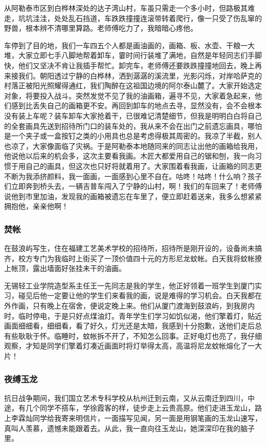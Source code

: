 \documentclass{article}
\begin{document}
从阿勒泰市区到白桦林深处的达子湾山村，车虽只需走一个多小时，但路极其难走，坑坑洼洼，处处乱石挡道，车跌跌撞撞连滚带转着爬行，像一只受了伤乱窜的野兽，根本辨不清哪里算路。老师傅吃力了，我暗暗心疼他。

车停到了目的地，我们一车四五个人都是画油画的，画箱、板、水壶、干粮一大堆，大家立即七手八脚地帮着卸车，霎时间行装堆了满地，自然是年轻同志们手脚快，他们又坚决不肯让我插手帮忙。卸完车，老师傅还要跌跌撞撞地回去，晚上再来接我们。朝阳透过宁静的白桦林，洒到潺潺的溪流里，光影闪烁，对岸哈萨克的村落正被阳光照耀得通红，我们陶醉在这祖国边境的阿尔泰山麓了。大家开始选定对象，将要投入战斗。突然发觉不见了我的油画箱，遍寻不见，大家着急起来，他们感到比丢失自己的画箱更不安。再回到卸车的地点去寻，显然没有，会不会根本没有装上车呢？装车卸车大家抢着干，已很难记清楚细节，但我是明明白白将自己的全套画具先送到招待所门口的装车处的，我从来不会在出门之前遗忘画具，哪怕是一个夹子或一盒按钉之类的小用具也总是考虑得极其周密的。我凉了半截，别人也凉了，大家像面临了灾祸。于是阿勒泰本地随同来的同志让出他的画箱给我用，他说他以后来的机会多，这次主要看我画。木匠大都爱用自己的锯和刨，我一向习惯于用自己的画具，但这次也只好将就着用了。大家围着看我画，让画箱的同志更不断为我添挤颜料，我一面画，一面感到心里不自在。咕咚！咕咚！什么响？孩子们立即奔到桥头去，一辆吉普车闯入了宁静的山村，啊！我们的车回来了！老师傅说他到市里加油，发现我的画箱被遗忘在车里了，便立即赶着送来，我多么想紧紧拥抱他，亲亲他啊！
\subsubsection{焚帐}
在鼓浪屿写生，住在福建工艺美术学校的招待所，招待所是刚开设的，设备尚未搞齐，校方专门为我临时上街买了一顶价值四十元的方形尼龙蚊帐。白天我将蚊帐撩上帐顶，露出墙面好张挂未干的油画。

无锡轻工业学院造型系主任王一先同志是我的学生，他正好领着一班学生到厦门实习，碰见后他一定要让他的学生们来看我的画，说是难得的学习机会。白天我都在外作画，只有晚上在宿舍，便说定晚上来。他们从厦门渡海到鼓浪屿，到我房内时，临时停电，于是只好点煤油灯。青年学生们学习如饥似渴，他们擎着灯，贴近画面细细看，细细看，看了好久，灯光还是太暗，我感到十分抱歉，送他们走后总有些耿耿于怀。临睡时，蚊帐拆不开了，不知怎么回事。正好电灯也亮了，我仔细观察，才知是同学们擎着灯凑近画面时将灯举得太高，高温将尼龙蚊帐熔化了一大片！
\subsubsection{夜缚玉龙}
抗日战争期间，我们国立艺术专科学校从杭州迁到云南，又从云南迁到四川，中途，有几个同学不搭车，学徐霞客的样，徒步走上云贵高原。他们走进玉龙山，路上李霖灿同学给我寄来明信片，一面描写见闻，另一面是用钢笔画的玉龙山速写，真叫人羡慕，遗憾未能跟着去。从此，我一直向往玉龙山，她深深印在我的脑子里。
\end{document}
